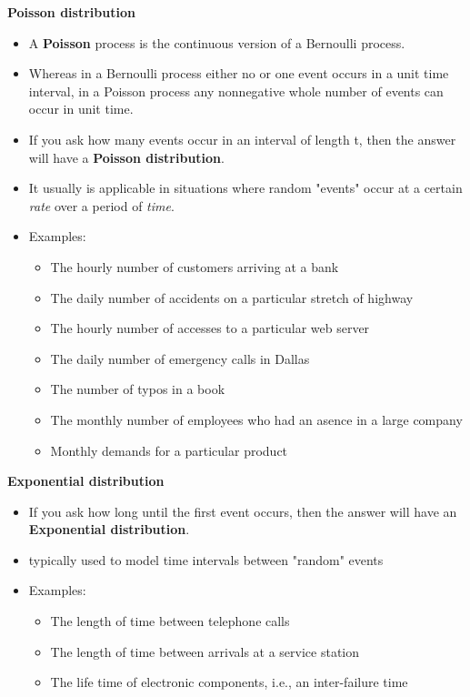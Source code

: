 \documentclass{../cheat}
\begin{document}
\begin{multicols}{3}
	\textbf{Poisson distribution}
	 \begin{itemize}
	 	\item A \textbf{Poisson} process is the continuous version of a Bernoulli process.
	 	\item Whereas in a Bernoulli process either no or one event occurs in a unit time interval, in a Poisson process any nonnegative whole number of events can occur in unit time.
	 	\item If you ask how many events occur in an interval of length t, then the answer will have a \textbf{Poisson distribution}.
	 	\item It usually is applicable in situations where random "events" occur at a certain \textit{rate} over a period of \textit{time}.
	 	\item Examples:
	 	\begin{itemize}
	 		\item The hourly number of customers arriving at a bank
	 		\item The daily number of accidents on a particular stretch of highway
	 		\item The hourly number of accesses to a particular web server
	 		\item The daily number of emergency calls in Dallas
	 		\item The number of typos in a book
	 		\item The monthly number of employees who had an asence in a large company
	 		\item Monthly demands for a particular product
	 	\end{itemize}
	\end{itemize} 
	\textbf{Exponential distribution}
	\begin{itemize} 
	 	\item If you ask how long until the first event occurs, then the answer will have an \textbf{Exponential distribution}.
	 	\item typically used to model time intervals between "random" events
	 	\item Examples:
	 	\begin{itemize}
	 		\item The length of time between telephone calls
	 		\item The length of time between arrivals at a service station
	 		\item The life time of electronic components, i.e., an inter-failure time
	 	\end{itemize}
	\end{itemize}
	

\end{multicols}
\end{document}

